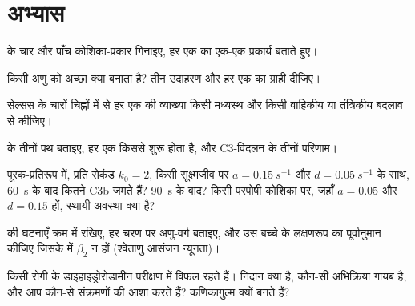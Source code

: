 \section{अभ्यास}

\begin{exercise}[$\star$]\label{exo:b3:innate-immunity:1}
 के चार  और पाँच कोशिका-प्रकार गिनाइए, हर एक का
एक-एक प्रकार्य बताते हुए।
\end{exercise}

\begin{exercise}[$\star$]\label{exo:b3:innate-immunity:2}
किसी अणु को अच्छा  क्या बनाता है? तीन उदाहरण
और हर एक का ग्राही दीजिए।
\end{exercise}

\begin{exercise}[$\star$]\label{exo:b3:innate-immunity:3}
सेल्सस के चारों चिह्नों में से हर एक की व्याख्या किसी मध्यस्थ और किसी
वाहिकीय या तंत्रिकीय बदलाव से कीजिए।
\end{exercise}

\begin{exercise}[$\star$]\label{exo:b3:innate-immunity:4}
 के तीनों पथ बताइए, हर एक किससे शुरू होता है, और C3-विदलन के
तीनों परिणाम।
\end{exercise}

\begin{exercise}[$\star\star$]\label{exo:b3:innate-immunity:5}
पूरक-प्रतिरूप में, प्रति सेकंड $k_{0} = 2$, किसी सूक्ष्मजीव पर $a =
\qty{0.15}{s^{-1}}$ और $d = \qty{0.05}{s^{-1}}$ के साथ, \qty{60}{s} के
बाद कितने C3b जमते हैं? \qty{90}{s} के बाद? किसी परपोषी कोशिका पर,
जहाँ $a = 0.05$ और $d = 0.15$ हों, स्थायी अवस्था क्या है?
\end{exercise}

\begin{exercise}[$\star\star$]\label{exo:b3:innate-immunity:6}
 की घटनाएँ क्रम में रखिए, हर चरण पर अणु-वर्ग बताइए, और
उस बच्चे के लक्षणरूप का पूर्वानुमान कीजिए जिसके  में
$\beta_{2}$  न हों (श्वेताणु आसंजन न्यूनता)।
\end{exercise}

\begin{exercise}[$\star\star$]\label{exo:b3:innate-immunity:7}
किसी रोगी के  डाइहाइड्रोरोडामीन परीक्षण में विफल रहते हैं।
निदान क्या है, कौन-सी अभिक्रिया गायब है, और आप कौन-से संक्रमणों की आशा
करते हैं? कणिकागुल्म क्यों बनते हैं?
\end{exercise}


